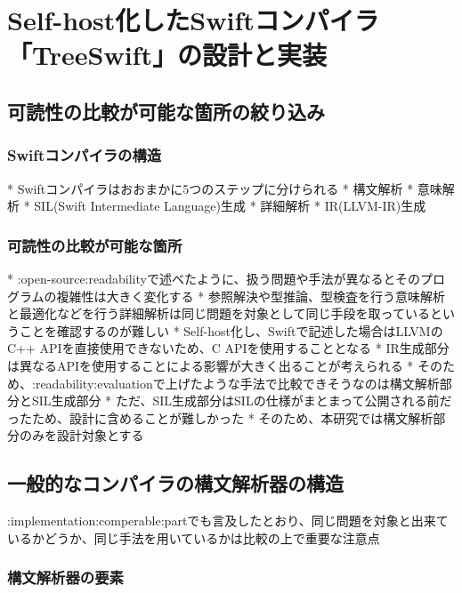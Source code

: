\chapter{Self-host化したSwiftコンパイラ「TreeSwift」の設計と実装}
\label{implementation}

\section{可読性の比較が可能な箇所の絞り込み}
\label{implementation:comperable}

\subsection{Swiftコンパイラの構造}
\label{implementation:comperable:structure}

* Swiftコンパイラはおおまかに5つのステップに分けられる
    * 構文解析
    * 意味解析
    * SIL(Swift Intermediate Language)生成
    * 詳細解析
    * IR(LLVM-IR)生成

\subsection{可読性の比較が可能な箇所}
\label{implementation:comperable:part}

* :open-source:readabilityで述べたように、扱う問題や手法が異なるとそのプログラムの複雑性は大きく変化する
* 参照解決や型推論、型検査を行う意味解析と最適化などを行う詳細解析は同じ問題を対象として同じ手段を取っているということを確認するのが難しい
* Self-host化し、Swiftで記述した場合はLLVMのC++ APIを直接使用できないため、C APIを使用することとなる
* IR生成部分は異なるAPIを使用することによる影響が大きく出ることが考えられる
* そのため、:readability:evaluationで上げたような手法で比較できそうなのは構文解析部分とSIL生成部分
* ただ、SIL生成部分はSILの仕様がまとまって公開される前だったため、設計に含めることが難しかった
* そのため、本研究では構文解析部分のみを設計対象とする


\section{一般的なコンパイラの構文解析器の構造}
\label{implementation:parser}

:implementation:comperable:partでも言及したとおり、同じ問題を対象と出来ているかどうか、同じ手法を用いているかは比較の上で重要な注意点

\subsection{構文解析器の要素}

